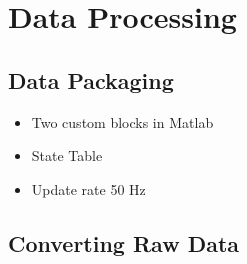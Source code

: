 \section{Data Processing}\label{sec:dataproc}
\subsection{Data Packaging}
\begin{itemize}
	\item Two custom blocks in Matlab
	\item State Table
	\item Update rate 50 Hz
\end{itemize}
\subsection{Converting Raw Data}
